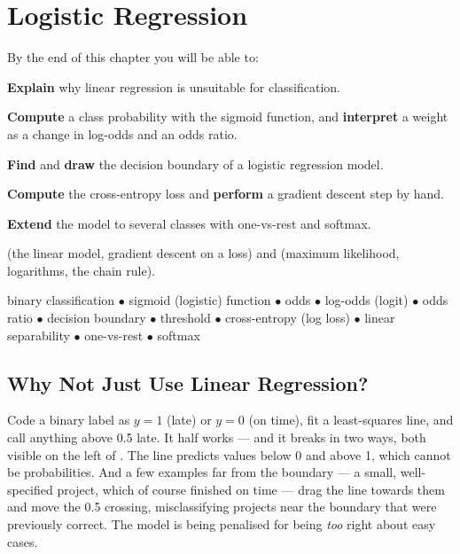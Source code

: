 \chapter{Logistic Regression}\label{ch:logreg}

\begin{outcomes}
By the end of this chapter you will be able to:
\begin{tight}
  \item \textbf{Explain} why linear regression is unsuitable for classification.
  \item \textbf{Compute} a class probability with the sigmoid function, and
        \textbf{interpret} a weight as a change in log-odds and an odds ratio.
  \item \textbf{Find} and \textbf{draw} the decision boundary of a logistic
        regression model.
  \item \textbf{Compute} the cross-entropy loss and \textbf{perform} a gradient
        descent step by hand.
  \item \textbf{Extend} the model to several classes with one-vs-rest and
        softmax.
\end{tight}
\end{outcomes}

\begin{prereq}
 (the linear model, gradient descent on a loss) and 
(maximum likelihood, logarithms, the chain rule).
\end{prereq}

\begin{keyterms}
binary classification $\bullet$ sigmoid (logistic) function $\bullet$ odds
$\bullet$ log-odds (logit) $\bullet$ odds ratio $\bullet$ decision boundary
$\bullet$ threshold $\bullet$ cross-entropy (log loss) $\bullet$ linear
separability $\bullet$ one-vs-rest $\bullet$ softmax
\end{keyterms}

\section{Why Not Just Use Linear Regression?}

Code a binary label as $y = 1$ (late) or $y = 0$ (on time), fit a least-squares
line, and call anything above 0.5 late. It half works --- and it breaks in two
ways, both visible on the left of . The line predicts
values below 0 and above 1, which cannot be probabilities. And a few examples far
from the boundary --- a small, well-specified project, which of course finished on
time --- drag the line towards them and move the 0.5 crossing, misclassifying
projects near the boundary that were previously correct. The model is being penalised for
being \emph{too} right about easy cases.

